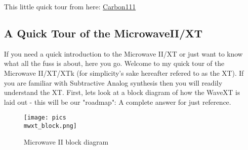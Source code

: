 This little quick tour from here: \href{https://www.carbon111.com/xt_intro.html}{Carbon111}
\subsection{A Quick Tour of the MicrowaveII/XT}
If you need a quick introduction to the Microwave II/XT or just want to know what all the fuss is about, here you go.
Welcome to my quick tour of the Microwave II/XT/XTk (for simplicity's sake hereafter refered to as the XT). If you are familiar with Subtractive Analog synthesis then you will readily understand the XT. First, lets look at a block diagram of how the WaveXT is laid out - this will be our "roadmap":
A complete answer for just reference.
\bigskip %
%
\begin{figure}[ht!]
	\centering
	\texttt{[image: pics\\mwxt\_block.png]}
	\caption{Microwave II block diagram}
	\label{blockdiagrammwxt}
\end{figure}
